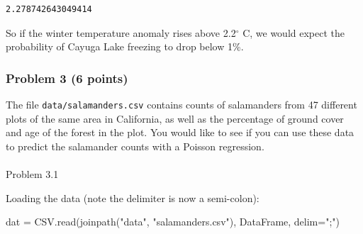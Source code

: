 \documentclass[
  letterpaper,
  DIV=11,
  numbers=noendperiod]{scrartcl}
\makeatletter
\let\oldparagraph\paragraph
\renewcommand{\paragraph}{
    \@ifstar
      \xxxParagraphStar
      \xxxParagraphNoStar
  }
\newcommand{\xxxParagraphStar}[1]{\oldparagraph*{#1}\mbox{}}
\newcommand{\xxxParagraphNoStar}[1]{\oldparagraph{#1}\mbox{}}
\newenvironment{Shaded}{\begin{snugshade}}{\end{snugshade}}
\newcommand{\FunctionTok}[1]{\textcolor[rgb]{0.28,0.35,0.67}{#1}}
\newcommand{\NormalTok}[1]{\textcolor[rgb]{0.00,0.23,0.31}{#1}}
\newcommand{\OperatorTok}[1]{\textcolor[rgb]{0.37,0.37,0.37}{#1}}
\newcommand{\StringTok}[1]{\textcolor[rgb]{0.13,0.47,0.30}{#1}}
\makeatother
\begin{document}
\begin{verbatim}
2.278742643049414
\end{verbatim}

So if the winter temperature anomaly rises above 2.2\(^\circ\) C, we
would expect the probability of Cayuga Lake freezing to drop below 1\%.

\subsubsection{Problem 3 (6 points)}\label{problem-3-6-points}

The file \texttt{data/salamanders.csv} contains counts of salamanders
from 47 different plots of the same area in California, as well as the
percentage of ground cover and age of the forest in the plot. You would
like to see if you can use these data to predict the salamander counts
with a Poisson regression.

\paragraph{Problem 3.1}\label{problem-3.1}

Loading the data (note the delimiter is now a semi-colon):

\begin{Shaded}
\begin{Highlighting}[]
\NormalTok{dat }\OperatorTok{=}\NormalTok{ CSV.}\FunctionTok{read}\NormalTok{(}\FunctionTok{joinpath}\NormalTok{(}\StringTok{"data"}\NormalTok{, }\StringTok{"salamanders.csv"}\NormalTok{), DataFrame, delim}\OperatorTok{=}\StringTok{";"}\NormalTok{)}
\end{Highlighting}
\end{Shaded}
\end{document}
